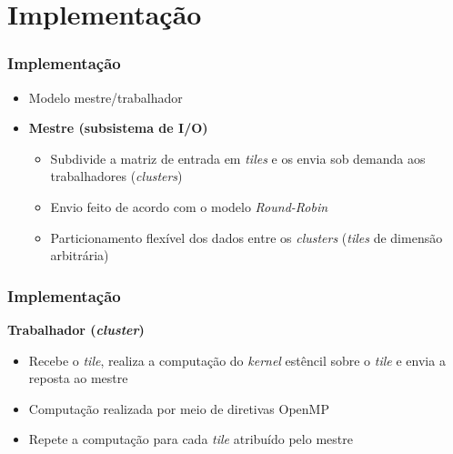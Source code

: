 \documentclass[xcolor={table}]{beamer}
\begin{document}

\section{Implementação}
\begin{frame}\frametitle{Implementação}
    \begin{itemize}
        \item {Modelo mestre/trabalhador}
        \item \textbf{Mestre (subsistema de I/O)}
            \begin{itemize}
                \item {Subdivide a matriz de entrada em \textit{tiles} e os envia sob demanda aos trabalhadores (\textit{clusters})}
                \item {Envio feito de acordo com o modelo \textit{Round-Robin}}
                \item {Particionamento flexível dos dados entre os \textit{clusters} (\textit{tiles} de dimensão arbitrária)}
            \end{itemize}
    \end{itemize}
\end{frame}


\begin{frame}\frametitle{Implementação}
    \textbf{Trabalhador (\textit{cluster})}
    \begin{itemize}
        \item {Recebe o \textit{tile}, realiza a computação do \textit{kernel} estêncil sobre o \textit{tile} e envia a reposta ao mestre}
            \item {Computação realizada por meio de diretivas OpenMP}
        \item {Repete a computação para cada \textit{tile} atribuído pelo mestre}
    \end{itemize}
\end{frame}
\end{document}

